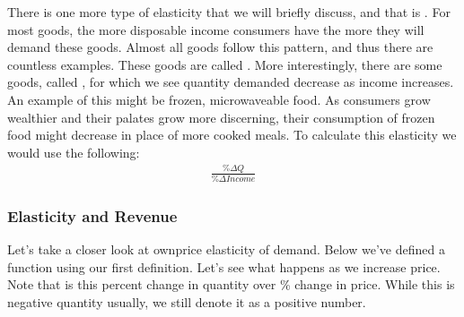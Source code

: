\documentclass[letterpaper,10pt,english]{jupyterBook}
\begin{document}
\sphinxAtStartPar
There is one more type of elasticity that we will briefly discuss, and that is . For most goods, the more disposable income consumers have the more they will demand these goods. Almost all goods follow this pattern, and thus there are countless examples. These goods are called . More interestingly, there are some goods, called , for which we see quantity demanded decrease as income increases. An example of this might be frozen, microwaveable food. As consumers grow wealthier and their palates grow more discerning, their consumption of frozen food might decrease in place of more cooked meals. To calculate this elasticity we would use the following:
\begin{equation*}
\begin{split}\frac{\%\Delta Q}{\%\Delta Income}\end{split}
\end{equation*}

\subsubsection{Elasticity and Revenue}
\label{\detokenize{content/01-demand/04-elasticity:elasticity-and-revenue}}
\sphinxAtStartPar
Let’s take a closer look at own\sphinxhyphen{}price elasticity of demand. Below we’ve defined a function using our first definition. Let’s see what happens as we increase price. Note that is this percent change in quantity over \% change in price. While this is negative quantity usually, we still denote it as a positive number.
\end{document}
